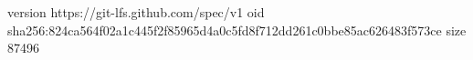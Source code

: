 version https://git-lfs.github.com/spec/v1
oid sha256:824ca564f02a1c445f2f85965d4a0c5fd8f712dd261c0bbe85ac626483f573ce
size 87496
